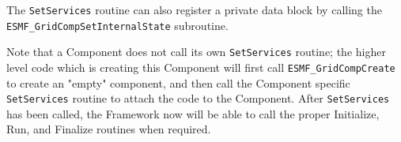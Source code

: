 The {\tt SetServices} routine can also register a private data block
by calling the {\tt ESMF\_GridCompSetInternalState} subroutine.

Note that a Component does not call its own {\tt SetServices} routine;
the higher level code which is creating this Component will first call
{\tt ESMF\_GridCompCreate} to create an "empty" component, and then call
the Component specific {\tt SetServices} routine to attach the code
to the Component.  After {\tt SetServices} has been called, the Framework
now will be able to call the proper Initialize, Run, and Finalize routines
when required.  


